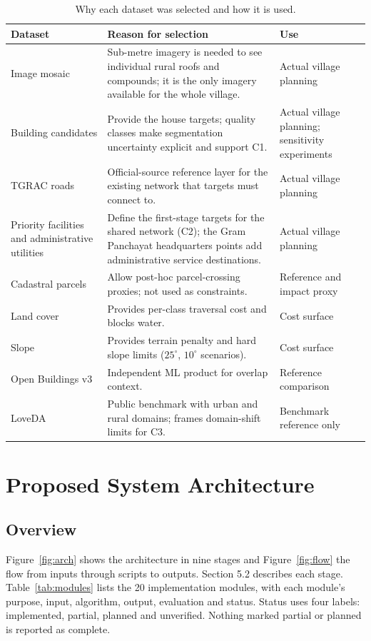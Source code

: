 \documentclass[12pt,a4paper]{report}
\begin{document}
\begin{table}[ht]\centering\small
\caption{Why each dataset was selected and how it is used.}\label{tab:datasets2}
\begin{tabularx}{\textwidth}{@{}p{3.2cm}Xp{3.0cm}@{}}\toprule
Dataset & Reason for selection & Use\\\midrule
Image mosaic & Sub-metre imagery is needed to see individual rural roofs and compounds; it is the only imagery available for the whole village. & Actual village planning\\
Building candidates & Provide the house targets; quality classes make segmentation uncertainty explicit and support C1. & Actual village planning; sensitivity experiments\\
TGRAC roads & Official-source reference layer for the existing network that targets must connect to. & Actual village planning\\
Priority facilities and administrative utilities & Define the first-stage targets for the shared network (C2); the Gram Panchayat headquarters points add administrative service destinations. & Actual village planning\\
Cadastral parcels & Allow post-hoc parcel-crossing proxies; not used as constraints. & Reference and impact proxy\\
Land cover & Provides per-class traversal cost and blocks water. & Cost surface\\
Slope & Provides terrain penalty and hard slope limits ($25^{\circ}$, $10^{\circ}$ scenarios). & Cost surface\\
Open Buildings v3 & Independent ML product for overlap context. & Reference comparison\\
LoveDA & Public benchmark with urban and rural domains; frames domain-shift limits for C3. & Benchmark reference only\\\bottomrule
\end{tabularx}
\end{table}

\chapter{Proposed System Architecture}\label{ch:arch}
\section{Overview}
Figure~\ref{fig:arch} shows the architecture in nine stages and Figure~\ref{fig:flow} the flow from inputs through scripts to outputs. Section 5.2 describes each stage. Table~\ref{tab:modules} lists the 20 implementation modules, with each module's purpose, input, algorithm, output, evaluation and status. Status uses four labels: implemented, partial, planned and unverified. Nothing marked partial or planned is reported as complete.
\end{document}
